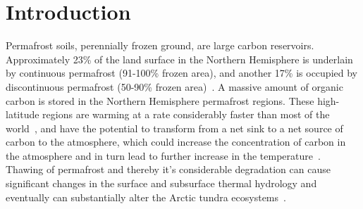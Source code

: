 \documentclass[review]{elsarticle}
\begin{document}
\linenumbers

\section{Introduction}

Permafrost soils, perennially frozen ground, are large carbon reservoirs. Approximately 23\% of the land surface in the Northern Hemisphere is underlain by continuous permafrost (91-100\% frozen area), and another 17\% is occupied by discontinuous permafrost (50-90\% frozen area)~\cite{brown1997circum,jorgenson2001permafrost}. A massive amount of organic carbon is stored in the Northern Hemisphere permafrost regions. These high-latitude regions are warming at a rate considerably faster than most of the world~\cite{tarnocai2009soil, turner2007arctic, hansen1999giss, assessment2004impacts}, and have the potential to transform from a net sink to a net source of carbon to the atmosphere, which could increase the concentration of carbon in the atmosphere and in turn lead to further increase in the temperature~\cite{billings1982arctic}. Thawing of permafrost and thereby it's considerable degradation can cause significant changes in the surface and subsurface thermal hydrology and eventually can substantially alter the Arctic tundra ecosystems~\cite{osterkamp1983response, walvoord2007increased, lyon2009estimation, pachauri2014climate,koven2013analysis}. 
\end{document}
